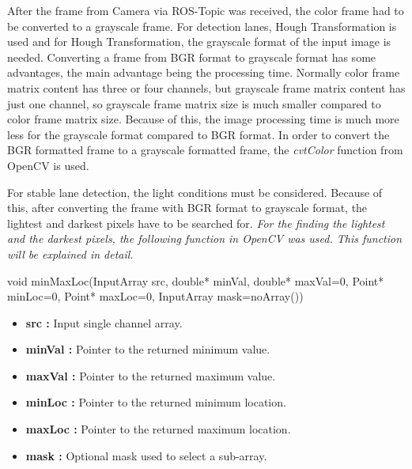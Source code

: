 After the frame from Camera via ROS-Topic was received, the color frame had to be converted to a grayscale frame. For detection lanes, Hough Transformation is used and for Hough Transformation, the grayscale format of the input image is needed. Converting a frame from BGR format to grayscale format has some advantages, the main advantage being the processing time. Normally color frame matrix content has three or four channels, but grayscale frame matrix content has just one channel, so grayscale frame matrix size is much smaller compared to color frame matrix size. Because of this, the image processing time is much more less for the grayscale format compared to BGR format. In order to convert the BGR formatted frame to a grayscale formatted frame, the \textit{cvtColor} function from OpenCV is used.

For stable lane detection, the light conditions must be considered. Because of this, after converting the frame with BGR format to grayscale format, the lightest and darkest pixels have to be searched for. \emph{\color{blue}For the finding the lightest and the darkest pixels, the following function in OpenCV was used. This function will be explained in detail.}\citep{addWeighted}


\begin{center}

void minMaxLoc(InputArray src, double* minVal, double* maxVal=0, Point* minLoc=0, Point* maxLoc=0, InputArray mask=noArray())

\end{center}

\begin{itemize}

\item \textbf{src : }Input single channel array.

\item \textbf{minVal : }Pointer to the returned minimum value.

\item \textbf{maxVal : }Pointer to the returned maximum value.

\item \textbf{minLoc : }Pointer to the returned minimum location.

\item \textbf{maxLoc : }Pointer to the returned maximum location.

\item \textbf{mask : }Optional mask used to select a sub-array.

\end{itemize}


